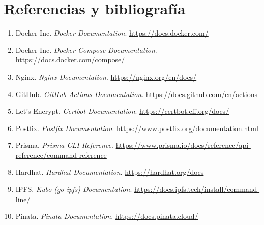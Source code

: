 \documentclass[11pt, a4paper]{article}
\begin{document}
\section{Referencias y bibliograf\'{i}a}

\begin{enumerate}
    \item Docker Inc. \textit{Docker Documentation}. \url{https://docs.docker.com/}
    \item Docker Inc. \textit{Docker Compose Documentation}. \url{https://docs.docker.com/compose/}
    \item Nginx. \textit{Nginx Documentation}. \url{https://nginx.org/en/docs/}
    \item GitHub. \textit{GitHub Actions Documentation}. \url{https://docs.github.com/en/actions}
    \item Let's Encrypt. \textit{Certbot Documentation}. \url{https://certbot.eff.org/docs/}
    \item Postfix. \textit{Postfix Documentation}. \url{https://www.postfix.org/documentation.html}
    \item Prisma. \textit{Prisma CLI Reference}. \url{https://www.prisma.io/docs/reference/api-reference/command-reference}
    \item Hardhat. \textit{Hardhat Documentation}. \url{https://hardhat.org/docs}
    \item IPFS. \textit{Kubo (go-ipfs) Documentation}. \url{https://docs.ipfs.tech/install/command-line/}
    \item Pinata. \textit{Pinata Documentation}. \url{https://docs.pinata.cloud/}
\end{enumerate}
\end{document}
